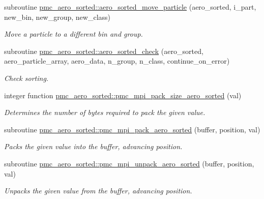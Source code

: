 \begin{DoxyCompactItemize}
subroutine \mbox{\hyperlink{namespacepmc__aero__sorted_a19dc894a59b6367f28ef65ddadeede55}{pmc\+\_\+aero\+\_\+sorted\+::aero\+\_\+sorted\+\_\+move\+\_\+particle}} (aero\+\_\+sorted, i\+\_\+part, new\+\_\+bin, new\+\_\+group, new\+\_\+class)
\begin{DoxyCompactList}\small\item\em Move a particle to a different bin and group. \end{DoxyCompactList}\item 
subroutine \mbox{\hyperlink{namespacepmc__aero__sorted_a3b355838730db411ca1190e2c8fb99a4}{pmc\+\_\+aero\+\_\+sorted\+::aero\+\_\+sorted\+\_\+check}} (aero\+\_\+sorted, aero\+\_\+particle\+\_\+array, aero\+\_\+data, n\+\_\+group, n\+\_\+class, continue\+\_\+on\+\_\+error)
\begin{DoxyCompactList}\small\item\em Check sorting. \end{DoxyCompactList}\item 
integer function \mbox{\hyperlink{namespacepmc__aero__sorted_a469c7678b144002576c666dc3bbfd51f}{pmc\+\_\+aero\+\_\+sorted\+::pmc\+\_\+mpi\+\_\+pack\+\_\+size\+\_\+aero\+\_\+sorted}} (val)
\begin{DoxyCompactList}\small\item\em Determines the number of bytes required to pack the given value. \end{DoxyCompactList}\item 
subroutine \mbox{\hyperlink{namespacepmc__aero__sorted_afdb70af4eedda6bd45f561864a348175}{pmc\+\_\+aero\+\_\+sorted\+::pmc\+\_\+mpi\+\_\+pack\+\_\+aero\+\_\+sorted}} (buffer, position, val)
\begin{DoxyCompactList}\small\item\em Packs the given value into the buffer, advancing position. \end{DoxyCompactList}\item 
subroutine \mbox{\hyperlink{namespacepmc__aero__sorted_a42d37f6234ca8cc529ffc5a90c80e85c}{pmc\+\_\+aero\+\_\+sorted\+::pmc\+\_\+mpi\+\_\+unpack\+\_\+aero\+\_\+sorted}} (buffer, position, val)
\begin{DoxyCompactList}\small\item\em Unpacks the given value from the buffer, advancing position. \end{DoxyCompactList}\end{DoxyCompactItemize}
